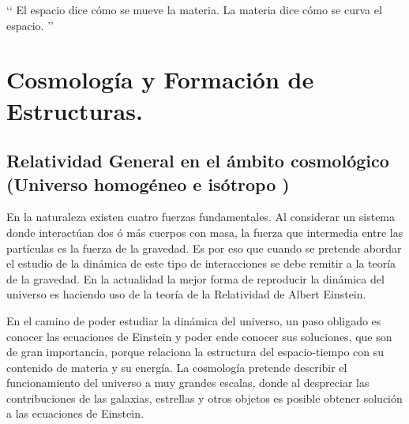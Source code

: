 \begin{savequote}[65mm]
‘‘
El espacio dice cómo se mueve la materia.
La materia dice cómo se curva el espacio.
’’
\end{savequote}




\chapter{Cosmología y Formación de Estructuras.}
\label{cha:Theoretical Framework}

\section{Relatividad General en el ámbito cosmológico (Universo homogéneo e isótropo )}
\label{sec:IsotropicAndHomogeneousUniverse}
En la naturaleza existen cuatro fuerzas fundamentales. Al considerar un sistema donde interactúan  dos ó más cuerpos con masa, la fuerza que intermedia entre las partículas  es la fuerza de la gravedad. Es por eso que cuando se pretende abordar el estudio de la dinámica de este tipo de interacciones se debe remitir a la teoría de la gravedad. En la actualidad la mejor forma de reproducir la dinámica del universo es haciendo uso de la teoría de la Relatividad de Albert Einstein.

En el camino de poder estudiar la dinámica del universo, un  paso obligado es conocer las ecuaciones de Einstein y poder ende conocer sus soluciones, que son de gran importancia, porque relaciona la estructura del espacio-tiempo con su contenido de materia y su energía. 
La cosmología pretende  describir el funcionamiento del universo a muy grandes escalas, donde al despreciar las contribuciones de las galaxias, estrellas y otros objetos es posible obtener solución a las ecuaciones de Einstein.

